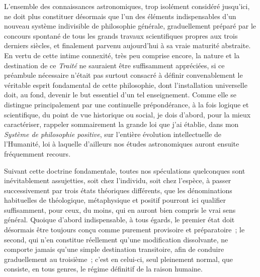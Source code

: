 \documentclass[french,twoside]{book} %
\begin{document}
\noindent L’ensemble des connaissances astronomiques, trop isolément considéré jusqu’ici, ne doit plus constituer désormais que l’un des éléments indispensables d’un nouveau système indivisible de philosophie générale, graduellement préparé par le concours spontané de tous les grands travaux scientifiques propres aux trois derniers siècles, et finalement parvenu aujourd’hui à sa vraie maturité abstraite. En vertu de cette intime connexité, très peu comprise encore, la nature et la destination de ce {\itshape Traité} ne sauraient être suffisamment appréciées, si ce préambule nécessaire n’était pas surtout consacré à définir convenablement le véritable esprit fondamental de cette philosophie, dont l’installation universelle doit, au fond, devenir le but essentiel d’un tel enseignement. Comme elle se distingue principalement par une continuelle prépondérance, à la fois logique et scientifique, du point de vue historique ou social, je dois d’abord, pour la mieux caractériser, rappeler sommairement la grande loi que j’ai établie, dans mon \emph{Système de philosophie positive}, sur l’entière évolution intellectuelle de l’Humanité, loi à laquelle d’ailleurs nos études astronomiques auront ensuite fréquemment recours.\par
Suivant cette doctrine fondamentale, toutes nos spéculations quelconques sont inévitablement assujetties, soit chez l’individu, soit chez l’espèce, à passer successivement par trois états théoriques différents, que les dénominations habituelles de théologique, métaphysique et positif pourront ici qualifier suffisamment, pour ceux, du moins, qui en auront bien compris le vrai sens général. Quoique d’abord indispensable, à tous égards, le premier état doit désormais être toujours conçu comme purement provisoire et préparatoire ; le second, qui n’en constitue réellement qu’une modification dissolvante, ne comporte jamais qu’une simple destination transitoire, afin de conduire graduellement au troisième ; c’est en celui-ci, seul pleinement normal, que consiste, en tous genres, le régime définitif de la raison humaine.\par
\end{document}
